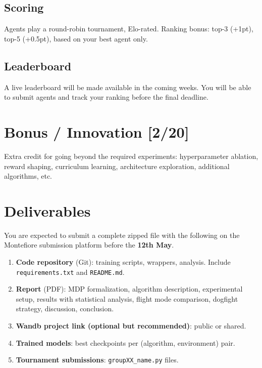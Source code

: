 \documentclass[11pt,a4paper]{article}
\newcommand{\pts}[1]{\hfill{\normalfont\normalsize\color{pts} [#1/20]}}
\begin{document}
\subsection{Scoring}

Agents play a round-robin tournament, Elo-rated. Ranking bonus: top-3 (+1pt), top-5 (+0.5pt), based on your best agent only.

\subsection{Leaderboard}

A live leaderboard will be made available in the coming weeks. You will be able to submit agents and track your ranking before the final deadline.

\section{Bonus / Innovation\pts{2}}
\label{sec:bonus}

Extra credit for going beyond the required experiments: hyperparameter ablation, reward shaping, curriculum learning, architecture exploration, additional algorithms, etc.

\section{Deliverables}
\label{sec:deliverables}

You are expected to submit a complete zipped file with the following on the Montefiore submission platform before the \textbf{12th May}.
\begin{enumerate}[nosep]
  \item \textbf{Code repository} (Git): training scripts, wrappers, analysis. Include \texttt{requirements.txt} and \texttt{README.md}.
  \item \textbf{Report} (PDF): MDP formalization, algorithm description, experimental setup, results with statistical analysis, flight mode comparison, dogfight strategy, discussion, conclusion.
  \item \textbf{Wandb project link (optional but recommended)}: public or shared.
  \item \textbf{Trained models}: best checkpoints per (algorithm, environment) pair.
  \item \textbf{Tournament submissions}: \texttt{groupXX\_name.py} files.
\end{enumerate}
\end{document}
